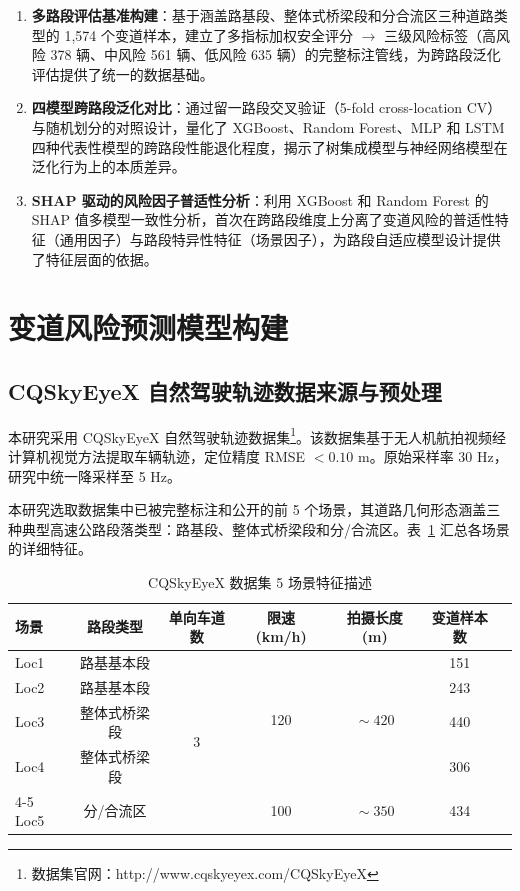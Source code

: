 \documentclass[preprint,review,12pt,a4paper]{elsarticle}
\begin{document}
\begin{enumerate}
  \item \textbf{多路段评估基准构建}：基于涵盖路基段、整体式桥梁段和分合流区三种道路类型的 1,574 个变道样本，建立了多指标加权安全评分 $\to$ 三级风险标签（高风险 378 辆、中风险 561 辆、低风险 635 辆）的完整标注管线，为跨路段泛化评估提供了统一的数据基础。
  \item \textbf{四模型跨路段泛化对比}：通过留一路段交叉验证（5-fold cross-location CV）与随机划分的对照设计，量化了 XGBoost、Random Forest、MLP 和 LSTM 四种代表性模型的跨路段性能退化程度，揭示了树集成模型与神经网络模型在泛化行为上的本质差异。
  \item \textbf{SHAP 驱动的风险因子普适性分析}：利用 XGBoost 和 Random Forest 的 SHAP 值多模型一致性分析，首次在跨路段维度上分离了变道风险的普适性特征（通用因子）与路段特异性特征（场景因子），为路段自适应模型设计提供了特征层面的依据。
\end{enumerate}

\section{变道风险预测模型构建}

\subsection{CQSkyEyeX 自然驾驶轨迹数据来源与预处理}

本研究采用 CQSkyEyeX 自然驾驶轨迹数据集\cite{C17}\footnote{数据集官网：http://www.cqskyeyex.com/CQSkyEyeX}。该数据集基于无人机航拍视频经计算机视觉方法提取车辆轨迹\cite{C24}，定位精度 RMSE $<0.10$ m。原始采样率 30 Hz，研究中统一降采样至 5 Hz。

本研究选取数据集中已被完整标注和公开的前 5 个场景，其道路几何形态涵盖三种典型高速公路段落类型：路基段、整体式桥梁段和分/合流区。表~\ref{tab:scenes} 汇总各场景的详细特征。

\begin{table}[H]
\centering
\caption{CQSkyEyeX 数据集 5 场景特征描述}
\label{tab:scenes}
\small
\begin{tabular}{lcccccc}
\toprule
场景 &  路段类型 & 单向车道数 & 限速 (km/h) & 拍摄长度 (m) & 变道样本数 \\
\midrule
Loc1 & 路基基本段 & \multirow{5}{*}{3} & \multirow{4}{*}{120} & \multirow{4}{*}{$\!\sim\!420$} & 151 \\
Loc2 & 路基基本段 &                    &                      &                               & 243 \\
Loc3 & 整体式桥梁段 &                  &                      &                               & 440 \\
Loc4 & 整体式桥梁段 &                  &                      &                               & 306 \\
\cmidrule(lr){4-5}
Loc5 & 分/合流区 &                    & 100                  & $\!\sim\!350$                 & 434 \\
\bottomrule
\end{tabular}
\end{table}
\end{document}

